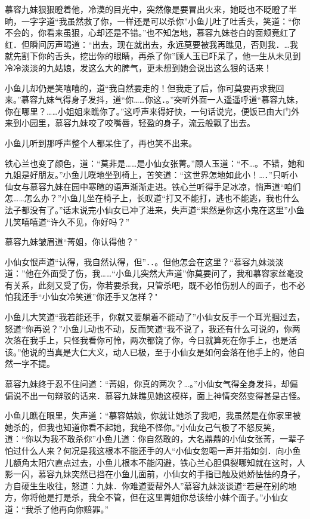 \documentclass[12pt,oneside]{book}
\begin{document}
慕容九妹狠狠瞪着他，冷漠的目光中，突然像是要冒出火来，她眨也不眨瞪了半晌，一字字道``我虽然救了你，一样还是可以杀你''小鱼儿吐了吐舌头，笑道：``你不会的，你看来虽狠，心却还是不错。''也不知怎地，慕容九妹苍白的面颊竟红了红．但瞬间厉声喝道：``出去，现在就出去，永远莫要被我再瞧见，否则我．\ldots 我就先割下你的舌头，挖出你的眼睛，再杀了你''顾人玉已吓呆了，他一生从未见到冷冷淡淡的九姑娘，发这么大的脾气，更未想到她会说出这么狠的话来！

小鱼儿却仍是笑嘻嘻的，道``我自然要走的！但我走了后，你可莫要再求我回来。''慕容九妹气得身子发抖，道``你\ldots\ldots 你这．。''突听外面一人遥遥呼道``慕容九妹，你在哪里？\ldots\ldots 小姐姐来瞧你了。''这呼声来得好快，一句话说完，便饭已由大门外来到小园里，慕容九妹咬了咬嘴唇，轻盈的身子，流云般飘了出去。

小鱼儿听到那呼声整个人都呆住了，再也笑不出来。

铁心兰也变了颜色，道：``莫非是\ldots\ldots 是小仙女张菁。''顾人玉道：``不\ldots。不错，她和九姐是好朋友。''小鱼儿噗地坐到椅上，苦笑道：``这世界怎地如此小！\ldots．''只听小仙女与慕容九妹在园中寒暄的语声渐渐走进。铁心兰听得手足冰凉，悄声道``咱们怎\ldots\ldots 怎么办？''小鱼儿坐在椅子上，长叹道``打又不能打，逃也不能逃，我也什么法子都没有了。''话末说完小仙女已冲了进来，失声道``果然是你这小鬼在这里''小鱼儿笑嘻嘻道``许久不见，你好吗？''

慕容九妹皱眉道``菁姐，你认得他？''

小仙女恨声道``认得，我自然认得，但''．．。但他怎会在这里？``慕容九妹淡淡道：''他在外面受了伤，我\ldots\ldots{}``小鱼儿突然大声道''你莫要问了，我和慕容家丝毫没有关系，此刻又受了伤，你若要杀我，只管杀吧，既不必怕伤别人的面子，也不必怕我还手``小仙女冷笑道''你还手又怎样？"

小鱼儿大笑道``我若能还手，你就又要躺着不能动了''小仙女反手一个耳光掴过去，怒道``你再说？''小鱼儿动也不动，反而笑道``我不说了，我还有什么可说的，你两次落在我手上，只怪我看你可怜，两次都饶了你，今日就算死在你手上，也是活该。''他说的当真是大仁大义，动人已极，至于小仙女是如何会落在他手上的，他自然一字不提。

慕容九妹终于忍不住问道：``菁姐，你真的两次？\ldots。''小仙女气得全身发抖，却偏偏说不出一句辩驳的话来．慕容九妹瞧见她这模样，面上神情突然变得甚是古怪。

小鱼儿瞧在眼里，失声道：``慕容姑娘，你就让她杀了我吧，我虽然是在你家里被她杀的，但我也知道你看不起她，我绝不怪你。''小仙女己气极了不怒反笑，道：``你以为我不敢杀你''小鱼儿道：你自然敢的，大名鼎鼎的小仙女张菁，一辈子怕过什么人来？何况是我这根本不能还手的人``小仙女忽喝一声并指如剑．向小鱼儿额角太阳穴直点过去，小鱼儿根本不能闪避，铁心兰心胆俱裂哪知就在这时，人影一闪，慕容九妹突然已挡在小鱼儿面前，小仙女的手指已触及她娇怯怯的身子，方自硬生生收往，怒道：九妹．你难道要帮外人''慕容九妹淡谈道``若是在别的地方，你将他是打是杀，我全不管，但在这里菁姐你总该给小妹个面子。''小仙女道：``我杀了他再向你赔罪。''
\end{document}
